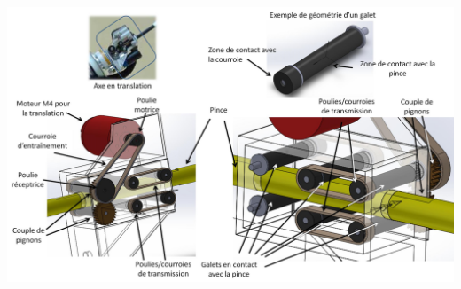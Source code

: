 \documentclass[10pt,fleqn]{article} %
\begin{document}
\ifprof
\else
\begin{center}
\includegraphics[width=\linewidth]{images/fig_04}
\end{center}
\fi
\end{document}
